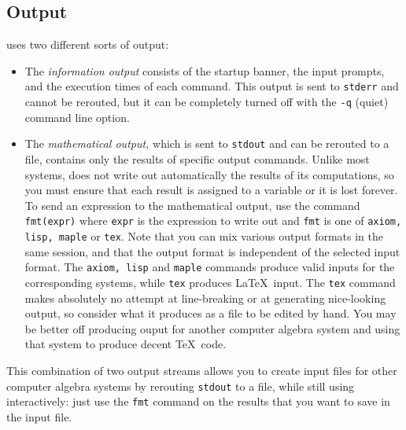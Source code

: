 \subsection{Output}
\bernina{} uses two different sorts of output:
\begin{itemize}
\item
The {\em information output} consists of the startup banner,
the input prompts, and the execution times of each command.
This output is sent to {\tt stderr} and cannot be rerouted,
but it can be completely turned off
with the {\tt -q} (quiet) command line option.
\item
The {\em mathematical output,\/} which is sent to {\tt stdout} and can
be rerouted to a file, contains only the results of specific output commands.
Unlike most systems, \bernina{} does not write out automatically the results
of its computations, so you must ensure that each result is assigned to a
variable or it is lost forever. To send an expression to the mathematical
output, use the command {\tt fmt(expr)} where {\tt expr} is the expression to
write out and {\tt fmt} is one of {\tt axiom, lisp, maple} or {\tt tex}.
Note that you
can mix various output formats in the same session, and that the output
format is independent of the selected input format. The {\tt axiom, lisp}
and {\tt maple} commands produce valid inputs for the corresponding systems,
while {\tt tex} produces \LaTeX~input. The {\tt tex} command makes absolutely
no attempt at line-breaking or at generating nice-looking output, so consider
what it produces as a file to be edited by hand. You may be better off
producing ouput for another computer algebra system and using that system
to produce decent \TeX~code.
\end{itemize}
This combination of two output streams allows you to create input files
for other computer algebra systems by rerouting {\tt stdout} to a file,
while still using \bernina{} interactively: just use the {\tt fmt} command
on the results that you want to save in the input file.
